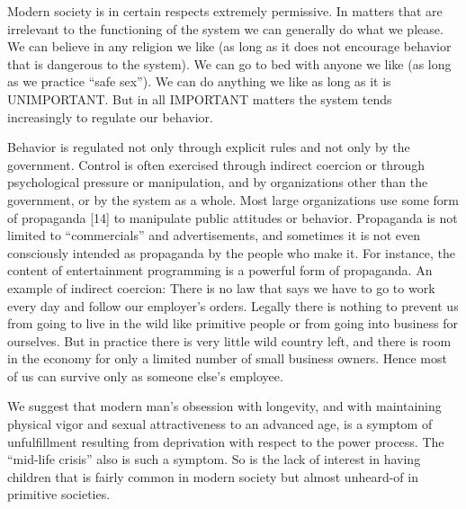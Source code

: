  Modern society is in certain respects extremely permissive. In matters that are irrelevant to the functioning of the system we can generally do what we please. We can believe in any religion we like (as long as it does not encourage behavior that is dangerous to the system). We can go to bed with anyone we like (as long as we practice “safe sex”). We can do anything we like as long as it is UNIMPORTANT. But in all IMPORTANT matters the system tends increasingly to regulate our behavior.

 Behavior is regulated not only through explicit rules and not only by the government. Control is often exercised through indirect coercion or through psychological pressure or manipulation, and by organizations other than the government, or by the system as a whole. Most large organizations use some form of propaganda [14] to manipulate public attitudes or behavior. Propaganda is not limited to “commercials” and advertisements, and sometimes it is not even consciously intended as propaganda by the people who make it. For instance, the content of entertainment programming is a powerful form of propaganda. An example of indirect coercion: There is no law that says we have to go to work every day and follow our employer’s orders. Legally there is nothing to prevent us from going to live in the wild like primitive people or from going into business for ourselves. But in practice there is very little wild country left, and there is room in the economy for only a limited number of small business owners. Hence most of us can survive only as someone else’s employee.

 We suggest that modern man’s obsession with longevity, and with maintaining physical vigor and sexual attractiveness to an advanced age, is a symptom of unfulfillment resulting from deprivation with respect to the power process. The “mid-life crisis” also is such a symptom. So is the lack of interest in having children that is fairly common in modern society but almost unheard-of in primitive societies.

